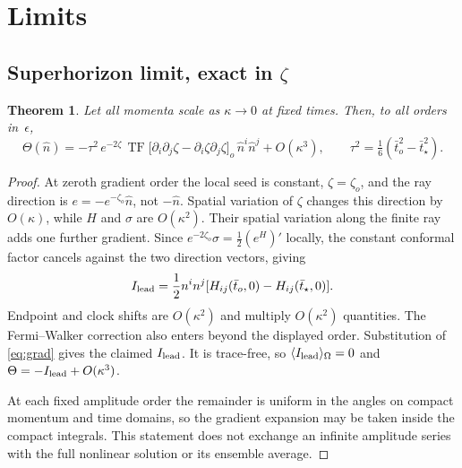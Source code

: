 \documentclass[11pt]{article}
\newtheorem{theorem}{Theorem}
\theoremstyle{definition}
\theoremstyle{remark}
\newcommand{\eps}{\epsilon}
\newcommand{\nh}{\hat n}
\newcommand{\sky}[1]{\langle #1\rangle_{\Omega}}
\newcommand{\TF}{\operatorname{TF}}
\begin{document}
\section{Limits}\label{sec:limits}

\subsection{Superhorizon limit, exact in \texorpdfstring{$\zeta$}{zeta}}\label{sec:sh}

\begin{theorem}\label{thm:sh}
Let all momenta scale as $\kappa\to0$ at fixed times. Then, to all orders in~$\eps$,
\[
\Theta(\nh)=-\tau^2\,e^{-2\zeta}\,\TF\big[\partial_i\partial_j\zeta-\partial_i\zeta\partial_j\zeta\big]_o\,\nh^i\nh^j+O(\kappa^3),
\qquad\tau^2=\tfrac16(\bar t_o^2-\bar t_\star^2).
\]
\end{theorem}
\begin{proof}
At zeroth gradient order the local seed is constant, $\zeta=\zeta_o$, and the ray direction
is $e=-e^{-\zeta_o}\nh$, not $-\nh$. Spatial variation of $\zeta$ changes this direction by
$O(\kappa)$, while $H$ and $\sigma$ are $O(\kappa^2)$. Their spatial variation along the
finite ray adds one further gradient. Since $e^{-2\zeta_o}\sigma=\frac12(e^H)'$ locally, the
constant conformal factor cancels against the two direction vectors, giving
\[
I_{\rm lead}=\frac12 n^in^j[H_{ij}(\bar t_o,0)-H_{ij}(\bar t_\star,0)].
\]
Endpoint and clock shifts are $O(\kappa^2)$ and multiply $O(\kappa^2)$ quantities. The
Fermi--Walker correction also enters beyond the displayed order. Substitution of
\eqref{eq:grad} gives the claimed $I_{\rm lead}$. It is trace-free, so
$\sky{I_{\rm lead}}=0$ and $\Theta=-I_{\rm lead}+O(\kappa^3)$.

At each fixed amplitude order the remainder is uniform in the angles on compact momentum
and time domains, so the gradient expansion may be taken inside the compact integrals.
This statement does not exchange an infinite amplitude series with the full nonlinear
solution or its ensemble average.

\end{proof}
\end{document}
